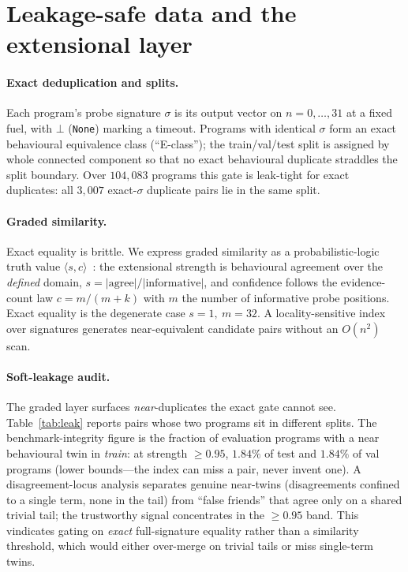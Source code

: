 \documentclass[11pt]{article}
\newcommand{\code}[1]{\texttt{#1}}
\newcommand{\sig}{\ensuremath{\sigma}}
\begin{document}
\section{Leakage-safe data and the extensional layer}
\label{sec:extensional}

\paragraph{Exact deduplication and splits.} Each program's probe signature \sig{} is its
output vector on $n=0,\dots,31$ at a fixed fuel, with $\bot$ (\code{None}) marking a
timeout. Programs with identical \sig{} form an exact behavioural equivalence class
(``E-class''); the train/val/test split is assigned by whole connected component so that no
exact behavioural duplicate straddles the split boundary. Over $104{,}083$ programs this
gate is leak-tight for exact duplicates: all $3{,}007$ exact-\sig{} duplicate pairs lie in
the same split.

\paragraph{Graded similarity.} Exact equality is brittle. We express graded similarity as a
probabilistic-logic truth value $\langle s,c\rangle$~\cite{pln2009}: the extensional
strength is behavioural agreement over the \emph{defined} domain,
$s = |{\text{agree}}| / |{\text{informative}}|$, and confidence follows the evidence-count
law $c = m/(m+k)$ with $m$ the number of informative probe positions. Exact equality is the
degenerate case $s=1,\ m=32$. A locality-sensitive index over signatures generates
near-equivalent candidate pairs without an $O(n^2)$ scan.

\paragraph{Soft-leakage audit.} The graded layer surfaces \emph{near}-duplicates the exact
gate cannot see. Table~\ref{tab:leak} reports pairs whose two programs sit in different
splits. The benchmark-integrity figure is the fraction of evaluation programs with a near
behavioural twin in \emph{train}: at strength $\ge 0.95$, $1.84\%$ of test and $1.84\%$ of
val programs (lower bounds---the index can miss a pair, never invent one). A
disagreement-locus analysis separates genuine near-twins (disagreements confined to a
single term, none in the tail) from ``false friends'' that agree only on a shared trivial
tail; the trustworthy signal concentrates in the $\ge 0.95$ band. This vindicates gating on
\emph{exact} full-signature equality rather than a similarity threshold, which would either
over-merge on trivial tails or miss single-term twins.
\end{document}
